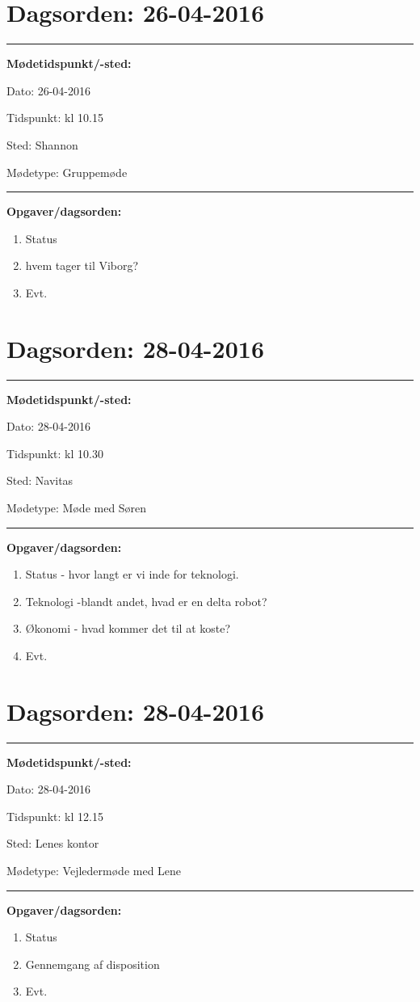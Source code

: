 \section{Dagsorden: 26-04-2016 }
\hrule
\textbf{Mødetidspunkt/-sted:} 

Dato: \tabto{7em} 26-04-2016

Tidspunkt: \tabto{7em} kl 10.15

Sted: \tabto{7em} Shannon 

Mødetype: \tabto{7em} Gruppemøde \newline


\hrule
\textbf{Opgaver/dagsorden:} \newline
\begin{enumerate}
	\item Status
	\item hvem tager til Viborg? 
	\item Evt. 
\end{enumerate} 

\newpage 
\section{Dagsorden: 28-04-2016 }
\hrule
\textbf{Mødetidspunkt/-sted:} 

Dato: \tabto{7em} 28-04-2016

Tidspunkt: \tabto{7em} kl 10.30

Sted: \tabto{7em} Navitas

Mødetype: \tabto{7em} Møde med Søren \newline


\hrule
\textbf{Opgaver/dagsorden:} \newline
\begin{enumerate}
	\item Status - hvor langt er vi inde for teknologi. 
	\item Teknologi -blandt andet, hvad er en delta robot? 
	\item Økonomi - hvad kommer det til at koste?  
	\item Evt. 
\end{enumerate} 

\section{Dagsorden: 28-04-2016 }
\hrule
\textbf{Mødetidspunkt/-sted:} 

Dato: \tabto{7em} 28-04-2016

Tidspunkt: \tabto{7em} kl 12.15

Sted: \tabto{7em} Lenes kontor

Mødetype: \tabto{7em} Vejledermøde med Lene \newline


\hrule
\textbf{Opgaver/dagsorden:} \newline
\begin{enumerate}
	\item Status
	\item Gennemgang af disposition
	\item Evt. 
\end{enumerate} 